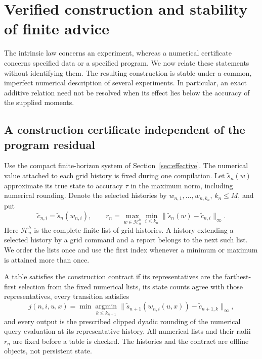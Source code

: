 \section{Verified construction and stability of finite advice}
\label{sec:construction-stability}
The intrinsic law concerns an experiment, whereas a numerical certificate
concerns specified data or a specified program. We now relate these
statements without identifying them. The resulting construction is stable
under a common, imperfect numerical description of several experiments.
In particular, an exact additive relation need not be resolved when its
effect lies below the accuracy of the supplied moments.

\subsection{A construction certificate independent of the program residual}
Use the compact finite-horizon system of Section~\ref{sec:effective}.
The numerical value attached to each grid history is fixed during one
compilation. Let $\widetilde s_n(w)$ approximate its true state to accuracy
$\tau$ in the maximum norm, including numerical rounding. Denote the
selected histories by $w_{n,1},\ldots,w_{n,k_n}$, $k_n\le M$, and put
\[
 \widetilde c_{n,i}=\widetilde s_n(w_{n,i}),\qquad
 r_n=\max_{w\in\mathcal H_n^h}\min_{i\le k_n}
             \|\widetilde s_n(w)-\widetilde c_{n,i}\|_\infty.
\]
Here $\mathcal H_n^h$ is the complete finite list of grid histories.
A history extending a selected history by a grid command and a report
belongs to the next such list. We order the lists once and use the first
index whenever a minimum or maximum is attained more than once.

\begin{definition}\label{def:construction-contract}
A table satisfies the construction contract if its representatives are
the farthest-first selection from the fixed numerical lists, its state
counts agree with those representatives, every transition satisfies
\begin{equation}\label{eq:nearest-contract}
 j(n,i,u,x)=\min\operatorname*{argmin}_{k\le k_{n+1}}
 \|\widetilde s_{n+1}(w_{n,i}(u,x))-
                               \widetilde c_{n+1,k}\|_\infty,
\end{equation}
and every output is the prescribed clipped dyadic rounding of the
numerical query evaluation at its representative history. All numerical
lists and their radii $r_n$ are fixed before a table is checked.
The histories and the contract are offline objects, not persistent state.
\end{definition}

